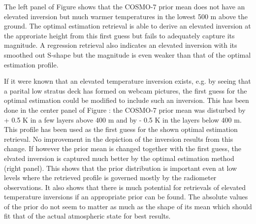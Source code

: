         {}

    The left panel of Figure  shows that the COSMO-7 prior
    mean does not have an elevated inversion but much warmer temperatures in
    the lowest 500 m above the ground. The optimal estimation retrieval is able
    to derive an elevated inversion at the approriate height from this first
    guess but fails to adequately capture its magnitude. A regression retrieval
    also indicates an elevated inversion with its smoothed out S-shape but
    the magnitude is even weaker than that of the optimal estimation profile.

    If it were known that an elevated temperature inversion exists, e.g.
    by seeing that a parital low stratus deck has formed on webcam pictures,
    the first guess for the optimal estimation could be modified to include
    such an inversion. This has been done in the center panel of Figure
    : the COSMO-7 prior mean was disturbed by + 0.5 K
    in a few layers above 400 m and by - 0.5 K in the layers below 400 m.
    This profile has been used as the first guess for the shown optimal
    estimation retrieval. No improvement in the depiction of the inversion
    results from this change. If however the prior mean is changed together
    with the first guess, the elvated inversion is captured much better by
    the optimal estimation method (right panel). This shows that the prior
    distribution is important even at low levels where the retrieved profile
    is governed mostly by the radiometer observations. It also shows that
    there is much potential for retrievals of elevated temperature inversions
    if an appropriate prior can be found. The absolute values of the prior do
    not seem to matter as much as the shape of its mean which should fit that
    of the actual atmospheric state for best results.

